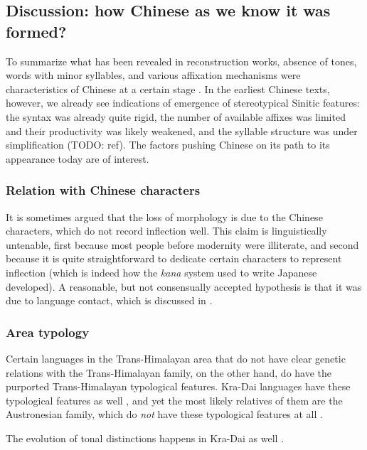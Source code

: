 \documentclass[UTF8, a4paper, oneside, scheme=plain, 12pt]{ctexrep}
\newcommand*{\citepage}[1]{p.~{#1}}
\newcommand{\form}[1]{\emph{#1}}
\begin{document}
\subsection{Discussion: how Chinese as we know it was formed?}

To summarize what has been revealed in reconstruction works,
absence of tones, words with minor syllables,
and various affixation mechanisms were characteristics of Chinese 
at a certain stage \citep[\citepage{13}]{sagart1999roots}.
In the earliest Chinese texts, however, we already see indications of
emergence of stereotypical Sinitic features:
the syntax was already quite rigid,
the number of available affixes was limited and their productivity was likely weakened,
and the syllable structure was under simplification (TODO: ref).
The factors pushing Chinese on its path to its appearance today are of interest.

\subsubsection{Relation with Chinese characters}

It is sometimes argued that the loss of morphology is due to the Chinese characters,
which do not record inflection well.
This claim is linguistically untenable,
first because most people before modernity were illiterate,
and second because it is quite straightforward to dedicate certain characters to represent inflection
(which is indeed how the \form{kana} system used to write Japanese developed).
A reasonable, but not consensually accepted hypothesis is that it was due to language contact,
which is discussed in .

\subsubsection{Area typology}
Certain languages in the Trans-Himalayan area that do not have clear genetic relations with the Trans-Himalayan family, on the other hand,
do have the purported Trans-Himalayan typological features.
Kra-Dai languages have these typological features as well \citep[\citepage{434}]{sidwell2021languages},
and yet the most likely relatives of them are the Austronesian family,
which do \emph{not} have these typological features at all \citep{sagart2004higher,ostapirat2005notes}.

The evolution of tonal distinctions happens in Kra-Dai as well \citep{sagart2019model}.
\end{document}
